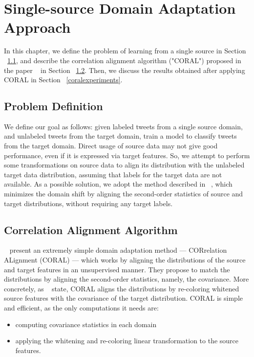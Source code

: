 \cleardoublepage

\chapter{Single-source Domain Adaptation Approach}
\label{coralchapter}

In this chapter, we define the problem of learning from a single source in Section ~\ref{coralproblemdefinitions}, and describe the correlation alignment algorithm ("CORAL") proposed in the paper ~\citep{coral} in Section ~\ref{coralalg}. Then, we discuss the results obtained after applying CORAL in Section ~\ref{coralexperiments}.

\section{Problem Definition}
\label{coralproblemdefinitions}

We define our goal as follows: given labeled tweets from a single source domain, and unlabeled tweets from the target domain, train a model to classify tweets from the target domain. Direct usage of source data may not give good performance, even if it is expressed via target features. So, we attempt to perform some transformations on source data to align its distribution with the unlabeled target data distribution, assuming that labels for the target data are not available. As a possible solution, we adopt the method described in ~\citep{coral}, which minimizes the domain shift by aligning the second-order statistics of source and target distributions, without requiring any target labels. 



\section{Correlation Alignment Algorithm}
\label{coralalg}

~\citet{coral} present an extremely simple domain adaptation method --- CORrelation ALignment (CORAL) --- which works by aligning the distributions of the source and target features in an unsupervised manner. They propose to match the distributions by aligning the second-order statistics, namely, the covariance. More concretely, as ~\citet{coral} state, CORAL aligns the distributions by re-coloring whitened source features with the covariance of the target distribution. CORAL is simple and efficient, as the only computations it needs are:
\begin{itemize}
  \item computing covariance statistics in each domain
  \item applying the whitening and re-coloring linear transformation to the source features.
\end{itemize}

